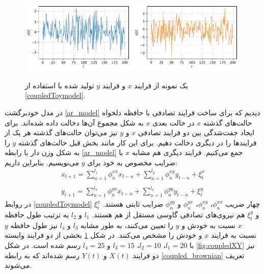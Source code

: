 \begin{figure}[H]
  \centering
  {\includegraphics[width=0.49\textwidth]{images/toy_model_sample_0.pdf}}
  {\includegraphics[width=0.49\textwidth]{images/toy_model_sample_1.pdf}}
  \caption{یک نمونه از فرایند $x$ و فرایند $y$ تولید شده با استفاده از \ref{coupledToymodel}.}\label{fig:coupled_xy}
\end{figure}
در مدل خودبرگشت \ref{ar_model} دیدیم که برای ساخت فرایند تصادفی با حافظه دلخواه حالت‌های گذشته $x$ در حالت بعدی $x$ به شکل مجموع آن‌ها دخالت داده شده‌اند.
برای ایجاد جفت‌شدگی بین دو فرایند تصادفی $x$ و $y$ نیز می‌توان حالت‌های گذشته هر یک از فرایندها را در دیگری دخالت دهیم. 
برای این کار مانند بخش قبل حالت‌های گذشته $y$ را به شکل وزن دار با رابطه \ref{ar_model} جمع می‌کنیم. فرایند دیگری هم 
مشابه $x$ با ضرایب مخصوص به خود برای $y$ می‌نویسیم. بنابراین داریم:
\begin{equation}
  \begin{array}{l}
    x_{t+1}=\sum_{n=1}^{l_1} \phi^{xx}_{n} x_{t-n}  + \sum_{n=1}^{l_2} \phi^{xy}_{n} y_{t-n} + \xi^{x}_{t} \\ \\
    y_{t+1}=\sum_{n=1}^{l_3} \phi^{yx}_{n} x_{t-n}  + \sum_{n=1}^{l_4} \phi^{yy}_{n} y_{t-n} + \xi^{y}_{t}
  \end{array}
  \label{coupledToymodel}
\end{equation}
در روابط \ref{coupledToymodel} چهار ضریب $\phi^{xx}_n$، $\phi^{xy}_n$، $\phi^{yx}_n$ و $\phi^{yy}_n$ ضرایب ثابتی هستند.
$\xi^x_t$ و $\xi^y_t$ هم نیروی‌های تصادفی گاوسی مستقل از هم هستند. $l_1$ و $l_2$ به ترتیب طول حافظه $x$ نسبت به خودش و $y$ را تعیین می‌کنند، به 
طور مشابه $l_3$ و $l_4$ نیز طول حافظه $y$ نسبت به فرایند $x$ و خودش را مشخص می‌کنند. 
در شکل \ref{fig:coupled_xy} بخشی از دو فرایند وابسته با $l_1=20$، $l_2=10$، $l_3=15$ و $l_4=25$ رسم شده است. 
در شکل \ref{fig:coupledXY} نیز دو فرایند $X(t)$ و $Y(t)$ رسم شده‌اند که به رابطه \ref{coupled_brownian} تعریف می‌شوند.

